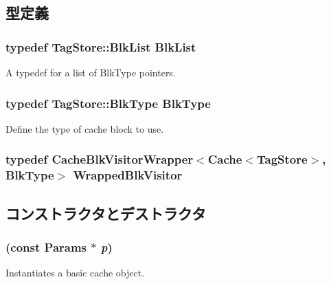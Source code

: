 \subsection{型定義}
\hypertarget{classCache_a83744fbcce9e00711343dafa32bcb921}{
\subsubsection[{BlkList}]{\setlength{\rightskip}{0pt plus 5cm}typedef TagStore::BlkList {\bf BlkList}}}
\label{classCache_a83744fbcce9e00711343dafa32bcb921}
A typedef for a list of BlkType pointers. \hypertarget{classCache_a10db52a1c10bfd238e0e3d37c4560495}{
\subsubsection[{BlkType}]{\setlength{\rightskip}{0pt plus 5cm}typedef TagStore::BlkType {\bf BlkType}}}
\label{classCache_a10db52a1c10bfd238e0e3d37c4560495}
Define the type of cache block to use. \hypertarget{classCache_afe5f62b7007c3a3cf9170e85041b38d8}{
\subsubsection[{WrappedBlkVisitor}]{\setlength{\rightskip}{0pt plus 5cm}typedef {\bf CacheBlkVisitorWrapper}$<${\bf Cache}$<$TagStore$>$, {\bf BlkType}$>$ {\bf WrappedBlkVisitor}}}
\label{classCache_afe5f62b7007c3a3cf9170e85041b38d8}


\subsection{コンストラクタとデストラクタ}
\hypertarget{classCache_a82f0d3b81dc0dc573633d0634508218a}{
\subsubsection[{Cache}]{ (const {\bf Params} $\ast$ {\em p})}}
\label{classCache_a82f0d3b81dc0dc573633d0634508218a}
Instantiates a basic cache object. 


